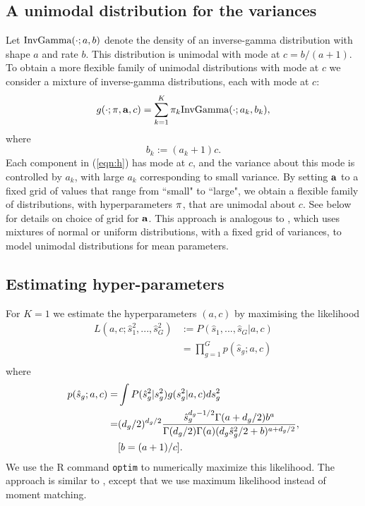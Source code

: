 \documentclass{bioinfo}
\begin{document}
\begin{methods}
\subsection{A unimodal distribution for the variances}
Let $\textrm{InvGamma}(\cdot;a,b)$ denote the density of an inverse-gamma distribution with shape $a$ and rate $b$. This distribution is unimodal with mode
at $c=b/(a+1)$. To obtain a more flexible family of unimodal distributions with mode at $c$ we consider a mixture of
inverse-gamma distributions, each with mode at $c$:
\begin{equation}
g(\cdot ; \mathbf \pi,\mathbf a,  c) = \sum\limits_{k=1}^K \pi_{k} \textrm{InvGamma}(\cdot;a_k,b_k), \label{eqn:h}
\end{equation}
where
\begin{equation}
b_k:=(a_k+1)c. \label{eqn:b1}
\end{equation}
Each component in (\ref{eqn:h}) has mode at $c$, and the variance about this mode is controlled by $a_k$, with large $a_k$
corresponding to small variance. By setting $\mathbf a$ to a fixed grid of values that range from ``small" to ``large", we obtain a flexible
family of distributions, with hyperparameters $\mathbf \pi$, that are unimodal about $c$. See below for details on choice of grid for $\mathbf a$.
This approach is analogous to \citet{stephens2016ash}, which uses mixtures of normal or uniform distributions, with a fixed grid of variances,
to model unimodal distributions for mean parameters.

\subsection{Estimating hyper-parameters}

For $K=1$ we estimate the hyperparameters $(a,c)$ by maximising the likelihood
\begin{align}
L(a,c ; \hat{s}_1^2,..., \hat{s}_G^2) &:= P(\hat{s}_1,...,\hat{s}_G| a, c) \\
& = \prod\limits_{g=1}^G p(\hat{s}_g; a, c) \\
\end{align}
where
\begin{align}
p(\hat{s}_g; a,c) =&\int P(\hat{s}_g^2|s_g^2) g(s_g^2|a, c)ds_g^2 \\
=&(d_g/2)^{d_g/2}\frac{\hat{s}_g^{d_g-1/2}\Gamma(a+d_g/2)b^{a}}{\Gamma(d_g/2)\Gamma(a)(d_g\hat{s}_g^2/2+b)^{a+d_g/2}}, \label{eqn:ps} \\
 &[b=(a+1)/c].
\end{align}
We use the R command {\tt optim} to numerically maximize this likelihood.
The approach is similar to \citet{smyth2004limma}, except that
we use maximum likelihood instead of moment matching.


\end{methods}
\end{document}
